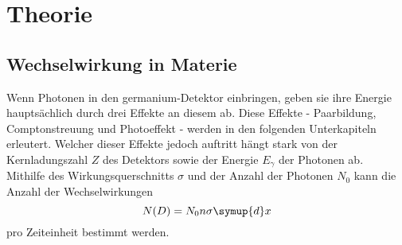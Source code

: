 \section{Theorie}
\subsection{Wechselwirkung in Materie}
Wenn Photonen in den germanium-Detektor einbringen, geben sie ihre Energie hauptsächlich durch drei Effekte an diesem ab. Diese Effekte - Paarbildung, Comptonstreuung und Photoeffekt - werden in den folgenden Unterkapiteln erleutert. Welcher dieser Effekte jedoch auftritt hängt stark von der Kernladungszahl $Z$ des Detektors sowie der Energie $E_\gamma$ der Photonen ab. \\
Mithilfe des Wirkungsquerschnitts $\sigma$ und der Anzahl der Photonen $N_0$ kann die Anzahl der Wechselwirkungen 
\begin{equation}
    N(D) = N_0 n \sigma \symup{d}x
\end{equation}
pro Zeiteinheit bestimmt werden. 


